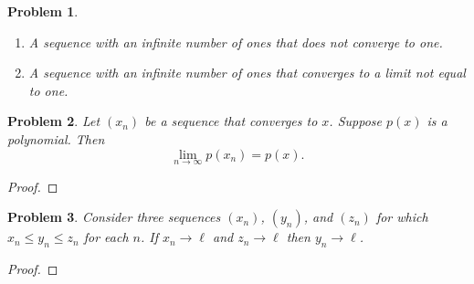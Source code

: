 \documentclass[12pt]{article}
\newtheorem{problem}{Problem}
\begin{document}

\begin{problem} %
\begin{enumerate}
\item A sequence with an infinite number of ones that does not converge to one.

\bigskip
\item A sequence with an infinite number of ones that converges to a limit not equal to one.

\bigskip
\end{enumerate}
\end{problem}


\begin{problem} %
Let $(x_n)$ be a sequence that converges to $x$.  Suppose $p(x)$ is a polynomial.  Then
	$$\lim_{n\to\infty} p(x_n) = p(x).$$
\end{problem}


\begin{proof}
\end{proof}


\begin{problem} %
Consider three sequences $(x_n)$, $(y_n)$, and $(z_n)$ for which $x_n \le y_n \le z_n$ for each $n$.  If $x_n \to \ell$ and $z_n \to \ell$ then $y_n \to \ell$.
\end{problem}


\begin{proof}
\end{proof}
\end{document}

